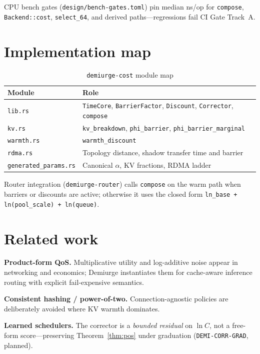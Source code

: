 \documentclass[11pt,a4paper]{article}
\begin{document}
CPU bench gates (\texttt{design/bench-gates.toml}) pin median ns/op for
\texttt{compose}, \texttt{Backend::cost}, \texttt{select\_64}, and derived
paths---regressions fail CI Gate Track~A.

\section{Implementation map}

\begin{table}[h]
  \centering
  \caption{\texttt{demiurge-cost} module map}
  \begin{tabular}{@{}ll@{}}
    \toprule
    Module & Role \\
    \midrule
    \texttt{lib.rs} & \texttt{TimeCore}, \texttt{BarrierFactor}, \texttt{Discount}, \texttt{Corrector}, \texttt{compose} \\
    \texttt{kv.rs} & \texttt{kv\_breakdown}, \texttt{phi\_barrier}, \texttt{phi\_barrier\_marginal} \\
    \texttt{warmth.rs} & \texttt{warmth\_discount} \\
    \texttt{rdma.rs} & Topology distance, shadow transfer time and barrier \\
    \texttt{generated\_params.rs} & Canonical $\alpha$, KV fractions, RDMA ladder \\
    \bottomrule
  \end{tabular}
\end{table}

Router integration (\texttt{demiurge-router}) calls \texttt{compose} on the
warm path when barriers or discounts are active; otherwise it uses the
closed form \texttt{ln\_base + ln(pool\_scale) + ln(queue)}.

\section{Related work}

\textbf{Product-form QoS.} Multiplicative utility and log-additive noise
appear in networking and economics; Demiurge instantiates them for
cache-aware inference routing with explicit fail-expensive semantics.

\textbf{Consistent hashing / power-of-two.} Connection-agnostic policies are
deliberately avoided where KV warmth dominates.

\textbf{Learned schedulers.} The corrector is a \emph{bounded residual} on
$\ln C$, not a free-form score---preserving Theorem~\ref{thm:pos} under
graduation (\texttt{DEMI-CORR-GRAD}, planned).
\end{document}
